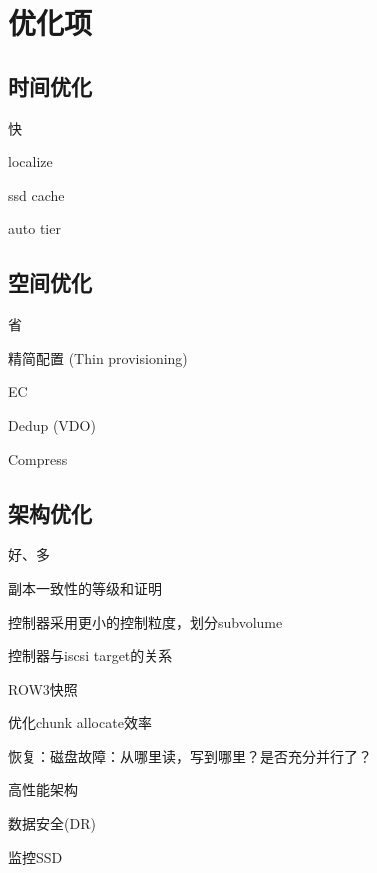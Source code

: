 \chapter{优化项}

\section{时间优化}

快

\begin{enumbox}
\item localize
\item ssd cache
\item auto tier
\end{enumbox}

\section{空间优化}

省

\begin{enumbox}
\item 精简配置 (Thin provisioning)
\item EC
\item Dedup (VDO)
\item Compress
\end{enumbox}

\section{架构优化}

好、多

\begin{enumbox}
\item 副本一致性的等级和证明
\item 控制器采用更小的控制粒度，划分subvolume
\item 控制器与iscsi target的关系
\item ROW3快照
\item 优化chunk allocate效率
\item 恢复：磁盘故障：从哪里读，写到哪里？是否充分并行了？
\item 高性能架构
\item 数据安全(DR)
\item 监控SSD
\end{enumbox}

